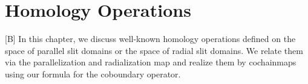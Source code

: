 \chapter{Homology Operations}
\label{homology_operations}

[B] In this chapter, we discuss well-known homology operations defined on the space of parallel slit domains or the space of radial slit domains.
We relate them via the parallelization and radialization map
and realize them by cochainmaps using our formula for the coboundary operator.








